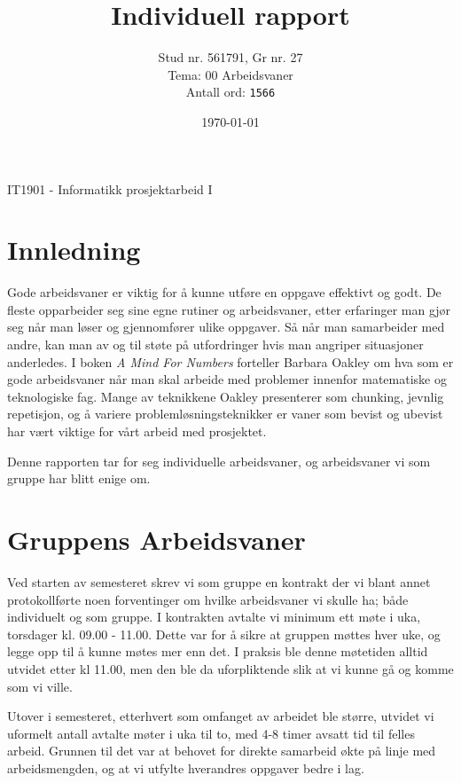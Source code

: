 \documentclass[a4paper, 12pt]{article}  %
\title{Individuell rapport}             %
\author{Stud nr. 561791, Gr nr. 27       %
\\Tema: 00 Arbeidsvaner
\\Antall ord: \texttt{1566}}
\date{\today}                           %
\begin{document}
\maketitle
\vfill
\begin{center}
    IT1901 - Informatikk prosjektarbeid I 
\end{center}
\thispagestyle{empty}
\addtocounter{page}{-1}
\newpage
\tableofcontents %
\thispagestyle{empty}
\addtocounter{page}{-1}
\newpage

\section{Innledning}

Gode arbeidsvaner er viktig for å kunne utføre en oppgave effektivt og godt.
De fleste opparbeider seg sine egne rutiner og arbeidsvaner, etter erfaringer man gjør seg når man løser og gjennomfører ulike oppgaver.
Så når man samarbeider med andre, kan man av og til støte på utfordringer hvis man angriper situasjoner anderledes.
I boken \emph{A Mind For Numbers} \cite{oakley} forteller Barbara Oakley om hva som er gode arbeidsvaner når man skal arbeide med problemer innenfor matematiske og teknologiske fag. Mange av teknikkene Oakley presenterer som chunking, jevnlig repetisjon, og å variere problemløsningsteknikker er vaner som bevist og ubevist har vært viktige for vårt arbeid med prosjektet.

Denne rapporten tar for seg individuelle arbeidsvaner, og arbeidsvaner vi som gruppe har blitt enige om.

\section{Gruppens Arbeidsvaner}

Ved starten av semesteret skrev vi som gruppe en kontrakt der vi blant annet protokollførte noen forventinger om hvilke arbeidsvaner vi skulle ha; både individuelt og som gruppe.
I kontrakten avtalte vi minimum ett møte i uka, torsdager kl. 09.00 - 11.00. Dette var for å sikre at gruppen møttes hver uke, og legge opp til å kunne møtes mer enn det. 
I praksis ble denne møtetiden alltid utvidet etter kl 11.00, men den ble da uforpliktende slik at vi kunne gå og komme som vi ville.

Utover i semesteret, etterhvert som omfanget av arbeidet ble større, utvidet vi uformelt antall avtalte møter i uka til to, med 4-8 timer avsatt tid til felles arbeid. 
Grunnen til det var at behovet for direkte samarbeid økte på linje med arbeidsmengden, og at vi utfylte hverandres oppgaver bedre i lag.
\end{document}
